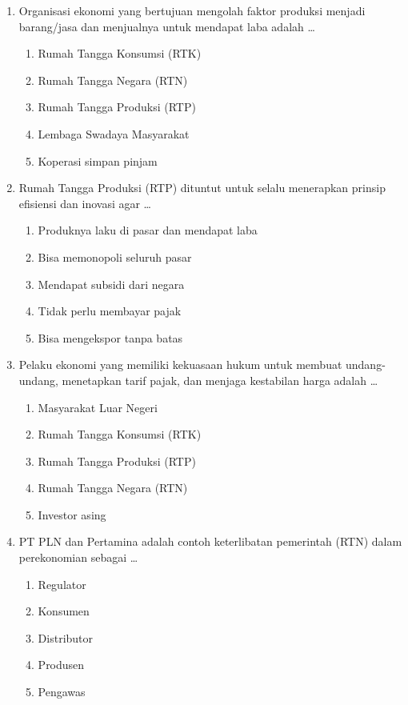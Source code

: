 \documentclass[12pt,a4paper]{article}
\begin{document}
\begin{enumerate}[leftmargin=*]
\item Organisasi ekonomi yang bertujuan mengolah faktor produksi menjadi barang/jasa dan menjualnya untuk mendapat laba adalah \dots
    \begin{enumerate}[label=\alph*.]
        \item Rumah Tangga Konsumsi (RTK)
        \item Rumah Tangga Negara (RTN)
        \item Rumah Tangga Produksi (RTP)
        \item Lembaga Swadaya Masyarakat
        \item Koperasi simpan pinjam
    \end{enumerate}

\item Rumah Tangga Produksi (RTP) dituntut untuk selalu menerapkan prinsip efisiensi dan inovasi agar \dots
    \begin{enumerate}[label=\alph*.]
        \item Produknya laku di pasar dan mendapat laba
        \item Bisa memonopoli seluruh pasar
        \item Mendapat subsidi dari negara
        \item Tidak perlu membayar pajak
        \item Bisa mengekspor tanpa batas
    \end{enumerate}

\item Pelaku ekonomi yang memiliki kekuasaan hukum untuk membuat undang-undang, menetapkan tarif pajak, dan menjaga kestabilan harga adalah \dots
    \begin{enumerate}[label=\alph*.]
        \item Masyarakat Luar Negeri
        \item Rumah Tangga Konsumsi (RTK)
        \item Rumah Tangga Produksi (RTP)
        \item Rumah Tangga Negara (RTN)
        \item Investor asing
    \end{enumerate}

\item PT PLN dan Pertamina adalah contoh keterlibatan pemerintah (RTN) dalam perekonomian sebagai \dots
    \begin{enumerate}[label=\alph*.]
        \item Regulator
        \item Konsumen
        \item Distributor
        \item Produsen
        \item Pengawas
    \end{enumerate}


\end{enumerate}
\end{document}

